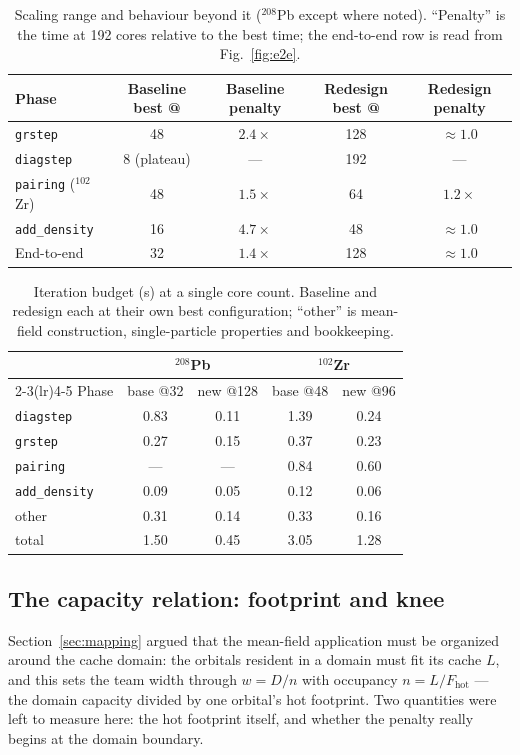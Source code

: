 \documentclass[preprint,12pt]{elsarticle}
\numberwithin{equation}{section}
\begin{document}
\begin{table}[tbp]\centering
\caption{Scaling range and behaviour beyond it ($^{208}$Pb except where noted). ``Penalty'' is the time at 192 cores relative to the best time; the end-to-end row is read from Fig.~\ref{fig:e2e}.}
\label{tab:scaling}
\begin{tabular}{lcccc}\toprule
Phase & Baseline best @ & Baseline penalty & Redesign best @ & Redesign penalty\\\midrule
\texttt{grstep} & 48 & $2.4\times$ & 128 & ${\approx}1.0$\\
\texttt{diagstep} & 8 (plateau) & --- & 192 & ---\\
\texttt{pairing} ($^{102}$Zr) & 48 & $1.5\times$ & 64 & $1.2\times$\\
\texttt{add\_density} & 16 & $4.7\times$ & 48 & ${\approx}1.0$\\
End-to-end & 32 & $1.4\times$ & 128 & ${\approx}1.0$\\\bottomrule
\end{tabular}
\end{table}

\begin{table}[tbp]\centering
\caption{Iteration budget (s) at a single core count. Baseline and redesign each at their own best configuration; ``other'' is mean-field construction, single-particle properties and bookkeeping.}
\label{tab:budget}
\begin{tabular}{lcccc}\toprule
 & \multicolumn{2}{c}{$^{208}$Pb} & \multicolumn{2}{c}{$^{102}$Zr}\\\cmidrule(lr){2-3}\cmidrule(lr){4-5}
Phase & base @32 & new @128 & base @48 & new @96\\\midrule
\texttt{diagstep} & 0.83 & 0.11 & 1.39 & 0.24\\
\texttt{grstep} & 0.27 & 0.15 & 0.37 & 0.23\\
\texttt{pairing} & --- & --- & 0.84 & 0.60\\
\texttt{add\_density} & 0.09 & 0.05 & 0.12 & 0.06\\
other & 0.31 & 0.14 & 0.33 & 0.16\\\midrule
total & 1.50 & 0.45 & 3.05 & 1.28\\\bottomrule
\end{tabular}
\end{table}

\subsection{The capacity relation: footprint and knee}\label{sec:capacity}
Section~\ref{sec:mapping} argued that the mean-field application must be organized around the cache domain: the orbitals resident in a domain must fit its cache $L$, and this sets the team width through $w = D/n$ with occupancy $n = L/F_{\text{hot}}$ --- the domain capacity divided by one orbital's hot footprint. Two quantities were left to measure here: the hot footprint itself, and whether the penalty really begins at the domain boundary.
\end{document}
